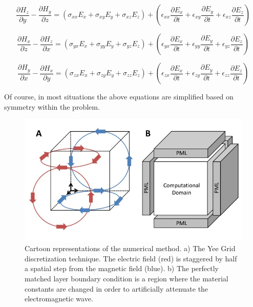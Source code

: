 \documentclass[a4paper]{article}
\begin{document}
\begin{equation}
    \frac{\partial H_z}{\partial y} - \frac{\partial H_y}{\partial z} = \left( \sigma_{xx} E_x +\sigma_{xy} E_y +\sigma_{xz} E_z \right) + \left( \epsilon_{xx}\frac{\partial E_x}{\partial t} + \epsilon_{xy}\frac{\partial E_y}{\partial t} + \epsilon_{xz}\frac{\partial E_z}{\partial t} \right)
\end{equation}

\begin{equation}
    \frac{\partial H_x}{\partial z} - \frac{\partial H_z}{\partial x} = \left( \sigma_{yx} E_x +\sigma_{yy} E_y +\sigma_{yz} E_z \right) + \left( \epsilon_{yx}\frac{\partial E_x}{\partial t} + \epsilon_{yy}\frac{\partial E_y}{\partial t} + \epsilon_{yz}\frac{\partial E_z}{\partial t} \right)
\end{equation}

\begin{equation}
    \frac{\partial H_y}{\partial x} - \frac{\partial H_x}{\partial y} = \left( \sigma_{zx} E_x +\sigma_{zy} E_y +\sigma_{zz} E_z \right) + \left( \epsilon_{zx}\frac{\partial E_x}{\partial t} + \epsilon_{zy}\frac{\partial E_y}{\partial t} + \epsilon_{zz}\frac{\partial E_z}{\partial t} \right)
\end{equation}

Of course, in most situations the above equations are simplified based on symmetry within the problem. 

\begin{figure}
    \centering
    \includegraphics[width=\textwidth]{./Figures/Methods_Figure.jpg}
    \caption{Cartoon representations of the numerical method. a) The Yee Grid discretization technique. The electric field (red) is staggered by half a spatial step from the magnetic field (blue). b) The perfectly matched layer boundary condition is a region where the material constants are changed in order to artificially attenuate the electromagnetic wave.}
    \label{fig:YeePML}
\end{figure}
\end{document}
